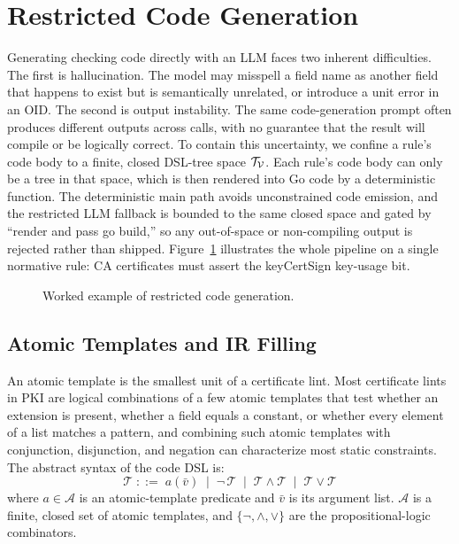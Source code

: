 \section{Restricted Code Generation}
\label{sec:codegen}

Generating checking code directly with an LLM faces two
inherent difficulties. The first is hallucination. The model may
misspell a field name as another field that happens to exist but is
semantically unrelated, or introduce a unit error in an OID. The second is
output instability. The same code-generation prompt often produces
different outputs across calls, with no guarantee that the result will compile or
be logically correct. To contain this uncertainty, we confine a rule's code body
to a finite, closed DSL-tree space $\mathcal{T}_{\mathcal{V}}$. Each rule's code body can only be a
tree in that space, which is then rendered into Go code by a deterministic
function. The deterministic main path avoids unconstrained code emission, and
the restricted LLM fallback is bounded to the same closed space and gated by
``render and pass go build,'' so any out-of-space or non-compiling output is
rejected rather than shipped.
Figure~\ref{fig:codegen-pipeline} illustrates the whole
pipeline on a single normative rule: CA certificates must assert the keyCertSign
key-usage bit.

\begin{figure}[tb]
  \centering
  \caption{Worked example of restricted code generation. }
  \label{fig:codegen-pipeline}
\end{figure}

\subsection{Atomic Templates and IR Filling}
\label{subsec:atoms}

An atomic template is the smallest unit of a certificate lint.
Most certificate lints in PKI are logical combinations of a
few atomic templates that test whether an extension is present, whether a
field equals a constant, or whether every element of a list matches a
pattern, and combining such atomic templates with conjunction, disjunction, and
negation can
characterize most static constraints. The abstract syntax of the code DSL is:
\begin{equation}\label{eq:grammar}
  \mathcal{T} \;::=\; a(\bar{v}) \;\mid\; \neg\, \mathcal{T} \;\mid\;
  \mathcal{T} \wedge \mathcal{T} \;\mid\; \mathcal{T} \vee \mathcal{T}
\end{equation}
where $a \in \mathcal{A}$ is an atomic-template predicate and $\bar{v}$ is its
argument list. $\mathcal{A}$ is a finite, closed set of atomic
templates, and $\{\neg, \wedge, \vee\}$ are
the propositional-logic combinators.

